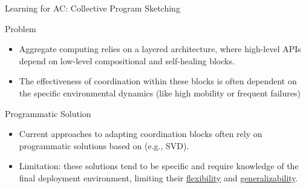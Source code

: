 \documentclass[presentation, 9pt,169]{beamer}\mode<presentation>{\usetheme{AMSBolognaFC}}
\begin{document}
\begin{frame}{Learning for AC: Collective Program Sketching}

  \begin{block}{Problem}
  
  \begin{itemize}
  \item Aggregate computing relies on a layered architecture, where high-level APIs depend on low-level compositional and self-healing blocks. 
  \item The effectiveness of coordination within these blocks is often dependent on the specific environmental dynamics (like high mobility or frequent failures)
  \end{itemize}
  \end{block}
  \begin{alertblock}{Programmatic Solution}
    \begin{itemize}
      \item Current approaches to adapting coordination blocks often rely on programmatic solutions based on \underline{} (e.g., SVD). 
      \item Limitation: these solutions tend to be  specific and require  knowledge of the final deployment environment, limiting their \underline{flexibility} and \underline{generalizability}.
    \end{itemize}
  \end{alertblock}
  \end{frame}
  
\end{document}
